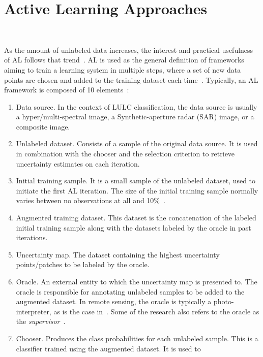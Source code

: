\documentclass[parskip=full]{scrartcl}
\begin{document}
\section{Active Learning Approaches}~\label{sec:al-sota}

As the amount of unlabeled data increases, the interest and practical
usefulness of AL follows that trend~\cite{Kottke2017}. AL is used as the
general definition of frameworks aiming to train a learning system in multiple
steps, where a set of new data points are chosen and added to the training
dataset each time~\cite{Ruzicka2020}. Typically, an AL framework is composed of
10 elements~\cite{Sverchkov2017,Su2020,Ruzicka2020}:

\begin{enumerate}
    \item Data source. In the context of LULC classification, the data source
        is usually a hyper/multi-spectral image, a Synthetic-aperture radar
        (SAR) image, or a composite image.
    \item Unlabeled dataset. Consists of a sample of the original data source.
        It is used in combination with the chooser and the selection criterion
        to retrieve uncertainty estimates on each iteration.
    \item Initial training sample. It is a small sample of the unlabeled
        dataset, used to initiate the first AL iteration. The size of the
        initial training sample normally varies between no observations at all
        and 10\%~\cite{Li2013}.
    \item Augmented training dataset. This dataset is the concatenation of the
        labeled initial training sample along with the datasets labeled by the
        oracle in past iterations.
    \item Uncertainty map. The dataset containing the highest uncertainty
        points/patches to be labeled by the oracle.
    \item Oracle. An external entity to which the uncertainty map is presented
        to. The oracle is responsible for annotating unlabeled samples to be
        added to the augmented dataset. In remote sensing, the oracle is
        typically a photo-interpreter, as is the case in~\cite{li2020}. Some of
        the research also refers to the oracle as the
        \textit{supervisor}~\cite{Su2020, Shrivastava2021}.
    \item Chooser. Produces the class probabilities for each unlabeled sample.
        This is a classifier trained using the augmented dataset. It is used to

\end{enumerate}
\end{document}
